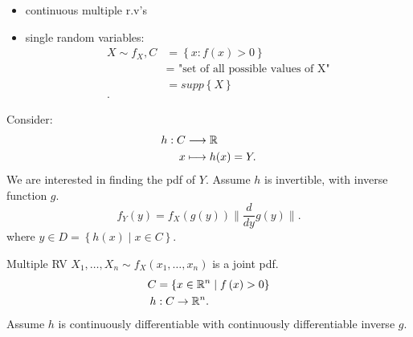 
\begin{itemize}
	\item continuous multiple r.v's
	\item single random variables:
		\begin{align*}
			X \sim f_{X}, C &= \left\{ x: f\left( x \right) > 0 \right\}  \\
			&= \text{ "set of all possible values of X"} \\
			 &= supp\left\{ X \right\}  \\
		.\end{align*}
\end{itemize}

Consider: \begin{align*}
	h : C &\longrightarrow \mathbb{R} \\
	x &\longmapsto h (x) = Y
.\end{align*}
We are interested in finding the pdf of $Y$. Assume $h$ is invertible, with inverse function $g$. 
\[
	f_{Y}\left( y \right) = f_{X}\left( g\left( y \right)  \right)  \|\frac{d}{dy} g\left( y \right) \|
.\] where $y \in D = \left\{ h\left( x \right)  \mid x \in  C \right\} $. 

Multiple RV $X_{1} , \ldots , X_{n} \sim f_{X}\left( x_{1} , \ldots , x_{n} \right) $ is a joint pdf. 
\begin{align*}
	C &= \left\{ x \in  \mathbb{R}^{n} \mid f\left( x  \right) > 0 \right\}  \\
	h  &: C \to \mathbb{R}^{n}
.\end{align*}
Assume $h$ is continuously differentiable with continuously differentiable inverse $g$.

